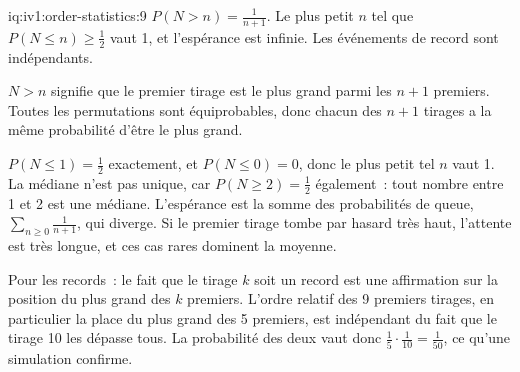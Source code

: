 \begin{solution}{iq:iv1:order-statistics:9}
$P(N > n) = \frac{1}{n + 1}$. Le plus petit $n$ tel que $P(N \le n) \ge \frac12$ vaut 1, et l'espérance est infinie. Les événements de record sont indépendants.

$N > n$ signifie que le premier tirage est le plus grand parmi les $n + 1$ premiers. Toutes les permutations sont équiprobables, donc chacun des $n + 1$ tirages a la même probabilité d'être le plus grand.

$P(N \le 1) = \tfrac12$ exactement, et $P(N \le 0) = 0$, donc le plus petit tel $n$ vaut 1. La médiane n'est pas unique, car $P(N \ge 2) = \tfrac12$ également~: tout nombre entre 1 et 2 est une médiane. L'espérance est la somme des probabilités de queue, $\sum_{n \ge 0} \frac{1}{n + 1}$, qui diverge. Si le premier tirage tombe par hasard très haut, l'attente est très longue, et ces cas rares dominent la moyenne.

Pour les records~: le fait que le tirage $k$ soit un record est une affirmation sur la position du plus grand des $k$ premiers. L'ordre relatif des 9 premiers tirages, en particulier la place du plus grand des 5 premiers, est indépendant du fait que le tirage 10 les dépasse tous. La probabilité des deux vaut donc $\tfrac15 \cdot \tfrac{1}{10} = \tfrac{1}{50}$, ce qu'une simulation confirme.

\end{solution}

